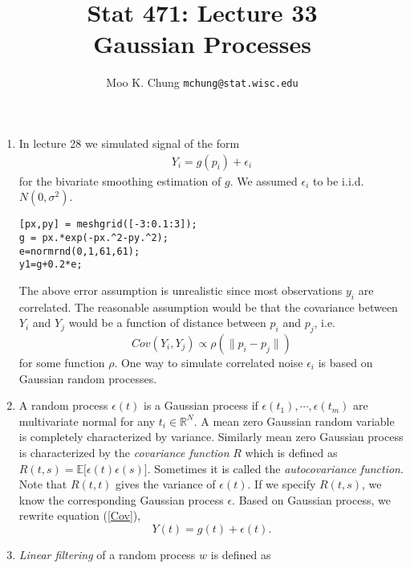 \documentclass[11pt,twocolumn]{article} %
\newcommand{\bq}{\begin{eqnarray}}
\newcommand{\eq}{\end{eqnarray}}
\begin{document}
\title{Stat 471: Lecture 33\\
Gaussian Processes}
\author{Moo K. Chung \tt{mchung@stat.wisc.edu}}
\maketitle \thispagestyle{empty}



\begin{enumerate}
\item In lecture 28 we simulated signal of the form \bq  Y_i =
g(p_i) + \epsilon_i\label{Cov}\eq for the bivariate smoothing
estimation of $g$. We assumed $\epsilon_i$ to be i.i.d.
$N(0,\sigma^2)$.
\begin{verbatim}
[px,py] = meshgrid([-3:0.1:3]);
g = px.*exp(-px.^2-py.^2);
e=normrnd(0,1,61,61);
y1=g+0.2*e;
\end{verbatim}
The above error assumption is unrealistic since most observations
$y_i$ are correlated. The reasonable assumption would be that the
covariance between $Y_i$ and $Y_j$ would be a function of distance
between $p_i$ and $p_j$, i.e. $${Cov} (Y_i,Y_j) \propto
\rho(\|p_i-p_j\|)$$ for some function $\rho$. One way to simulate
correlated noise $\epsilon_i$ is based on Gaussian random
processes.

\item A random process $\epsilon(t)$ is a Gaussian process if
$\epsilon(t_1),\cdots, \epsilon(t_m)$ are multivariate normal for
any $t_i \in \mathbb{R}^N$. A mean zero Gaussian random variable
is completely characterized by variance. Similarly mean zero
Gaussian process is characterized by the {\em covariance function}
$R$ which is defined as $R(t,s) = \mathbb{E}\big[
\epsilon(t)\epsilon(s)\big]$. Sometimes it is called the {\em
autocovariance function}. Note that $R(t,t)$ gives the variance of
$\epsilon(t)$. If we specify $R(t,s)$, we know the corresponding
Gaussian process $\epsilon$. Based on Gaussian process, we rewrite
equation (\ref{Cov}),
$$Y(t) = g(t) + \epsilon(t).$$


 \item {\em Linear filtering} of a random process $w$ is
defined as


\end{enumerate}
\end{document}
